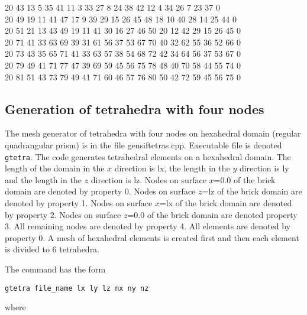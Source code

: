\documentclass[12pt]{book}
\begin{document}
{20 43 13 5 35 41 11 3 33 27 8 24 38 42 12 4 34 26 7 23 37   0\\
20 49 19 11 41 47 17 9 39 29 15 26 45 48 18 10 40 28 14 25 44   0\\
20 51 21 13 43 49 19 11 41 30 16 27 46 50 20 12 42 29 15 26 45   0\\
20 71 41 33 63 69 39 31 61 56 37 53 67 70 40 32 62 55 36 52 66   0\\
20 73 43 35 65 71 41 33 63 57 38 54 68 72 42 34 64 56 37 53 67   0\\
20 79 49 41 71 77 47 39 69 59 45 56 75 78 48 40 70 58 44 55 74   0\\
20 81 51 43 73 79 49 41 71 60 46 57 76 80 50 42 72 59 45 56 75   0\\
}




\subsection{Generation of tetrahedra with four nodes}

The mesh generator of tetrahedra with four nodes on hexahedral domain (regular quadrangular prism) is in the file gensiftetras.cpp.
Executable file is denoted {\tt gtetra}. The code generates tetrahedral elements on a hexahedral domain.
The length of the domain in the $x$ direction is lx, the length in the $y$ direction is ly and
the length in the $z$ direction is lz. Nodes on surface $x$=0.0 of the brick domain are denoted by property 0.
Nodes on surface $z$=lz of the brick domain are denoted by property 1.
Nodes on surface $x$=lx of the brick domain are denoted by property 2.
Nodes on surface $z$=0.0 of the brick domain are denoted property 3.
All remaining nodes are denoted by property 4.
All elements are denoted by property 0.
A mesh of hexahedral elements is created first and then each element is divided to 6 tetrahedra.

\vspace{2mm}
\noindent
The command has the form

{\tt gtetra file\_name lx ly lz nx ny nz}

\vspace{2mm}
\noindent
where
\end{document}
